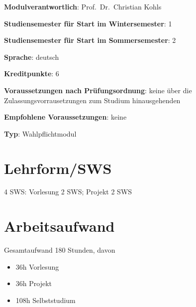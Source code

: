 \begin{modulHead}
\textbf{Modulverantwortlich}: Prof.~Dr.~Christian
Kohls
\end{modulHead}
\begin{modulHead}
\textbf{Studiensemester für
Start im Wintersemester}:
1
\end{modulHead}
\begin{modulHead}
\textbf{Studiensemester für Start
im Sommersemester}:
2
\end{modulHead}
\begin{modulHead}
\textbf{Sprache}:
deutsch
\end{modulHead}
\begin{modulHead}
\textbf{Kreditpunkte}:
6
\end{modulHead}
\begin{modulHead}
\textbf{Voraussetzungen nach
Prüfungsordnung}: keine über die Zulassungsvorrausetzungen zum Studium
hinausgehenden
\end{modulHead}
\begin{modulHead}
\textbf{Empfohlene
Voraussetzungen}: keine
\end{modulHead}
\begin{modulHead}
\textbf{Typ}:
Wahlpflichtmodul
\end{modulHead}


\section*{Lehrform/SWS\label{/mi-2017/modulbeschreibungen-master/MA_SC_WPF_eScience}}\label{lehrformswspathlabelmi-2017modulbeschreibungen-mastermaux5fscux5fwpfux5fescience}

4 SWS: Vorlesung 2 SWS; Projekt 2 SWS

\section*{Arbeitsaufwand\label{/mi-2017/modulbeschreibungen-master/MA_SC_WPF_eScience}}\label{arbeitsaufwandpathlabelmi-2017modulbeschreibungen-mastermaux5fscux5fwpfux5fescience}

Gesamtaufwand 180 Stunden, davon

\begin{itemize}
\tightlist
\item
  36h Vorlesung
\item
  36h Projekt
\item
  108h Selbststudium
\end{itemize}

